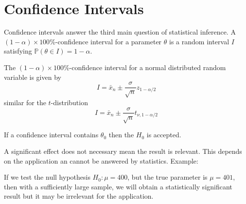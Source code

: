 \section{Confidence Intervals}
Confidence intervals answer the third main question of statistical inference.
A $(1-\alpha)\times 100\%$-confidence interval for a parameter $\theta$ is a random interval $I$ satisfying $\mathbb{P}(\theta\in I)=1-\alpha$.

The $(1-\alpha)\times 100\%$-confidence interval for a normal distributed random variable is given by
\begin{equation*}
    I=\bar{x}_n \pm \frac{\sigma}{\sqrt{n}}z_{1-\alpha/2}
\end{equation*}
similar for the $t$-distribution
\begin{equation*}
    I=\bar{x}_n \pm \frac{\sigma}{\sqrt{n}}t_{\nu,1-\alpha/2}
\end{equation*}

\newpar{}

If a confidence interval contains $\theta_0$ then the $H_0$ is accepted.

\newpar{}

A significant effect does not necessary mean the result is relevant. This depends on the application an cannot be answered by statistics.
\newpar{}
Example:

If we test the null hypothesis $H_0:\mu=400$, but the true parameter is $\mu=401$, then with a sufficiently large sample, we will obtain a statistically significant result but it may be irrelevant for the application.